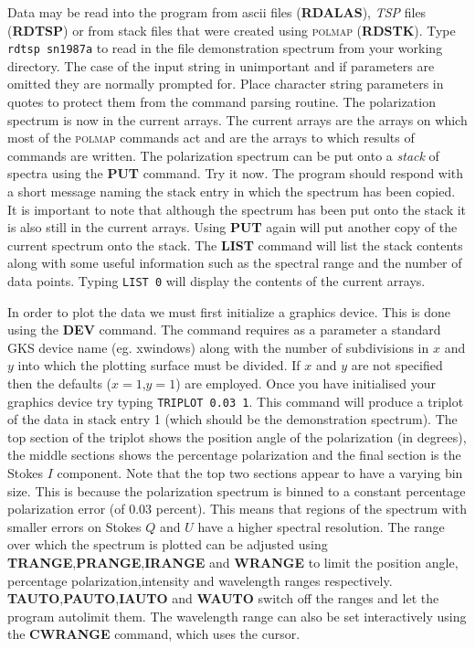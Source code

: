\documentclass[11pt,nolof,noabs]{starlink}
\begin{document}
Data may be read into the program from ascii files (\textbf{RDALAS}), \textit{TSP} files (\textbf{RDTSP}) or from stack files that were created using
\textsc{polmap} (\textbf{RDSTK}).   Type \texttt{rdtsp sn1987a} to read in the
file demonstration spectrum from your working directory. The case of
the input string in unimportant and if parameters are omitted they are
normally prompted for. Place character string parameters in quotes to
protect them from the command parsing routine.  The polarization
spectrum is now in the current arrays. The current arrays are the
arrays on which most of the \textsc{polmap} commands act and are the
arrays to which results of commands are written. The polarization
spectrum can be put onto a \textit{stack} of spectra using the \textbf{PUT}
command. Try it now. The program should respond with a short message
naming the stack entry in which the spectrum has been copied. It is
important to note that although the spectrum has been put onto the
stack it is also still in the current arrays.  Using \textbf{PUT} again
will put another copy of the current spectrum onto the stack. The \textbf{LIST} command will list the stack contents along with some useful
information such as the spectral range and the number of data points.
Typing \texttt{LIST 0} will display the contents of the current arrays.

In order to plot the data we must first initialize a graphics
device. This is done using the \textbf{DEV} command. The command requires
as a parameter a standard GKS device name (eg. xwindows) along with
the number of subdivisions in $x$ and $y$ into which the plotting
surface must be divided. If $x$ and $y$ are not specified then the
defaults ($x=1$,$y=1$) are employed. Once you have initialised your
graphics device try typing \texttt{TRIPLOT 0.03 1}. This command will
produce a triplot of the data in stack entry 1 (which should be the
demonstration spectrum). The top section of the triplot shows the
position angle of the polarization (in degrees), the middle sections
shows the percentage polarization and the final section is the Stokes
$I$ component. Note that the top two sections appear to have a varying
bin size. This is because the polarization spectrum is binned to a
constant percentage polarization error (of 0.03 percent). This means
that regions of the spectrum with smaller errors on Stokes $Q$ and $U$
have a higher spectral resolution. The range over which the spectrum
is plotted can be adjusted using \textbf{TRANGE},\textbf{PRANGE},\textbf{IRANGE} and \textbf{WRANGE} to limit the position angle, percentage
polarization,intensity and wavelength ranges respectively. \textbf{TAUTO},\textbf{PAUTO},\textbf{IAUTO} and \textbf{WAUTO} switch off the ranges
and let the program autolimit them. The wavelength range can also be
set interactively using the \textbf{CWRANGE} command, which uses the
cursor.
\end{document}

